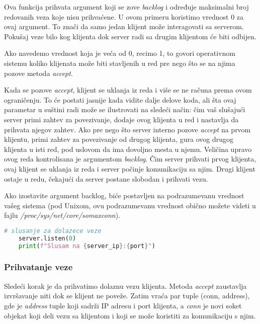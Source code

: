 Ova funkcija prihvata argument koji se zove \emph{backlog} i određuje maksimalni broj redovanih veza koje nisu prihvaćene. U ovom primeru koristimo vrednost 0 za ovaj argument. To znači da samo jedan klijent može interagovati sa serverom. Pokušaj veze bilo kog klijenta dok server radi sa drugim klijentom će biti odbijen.

Ako navedemo vrednost koja je veća od 0, recimo 1, to govori operativnom sistemu koliko klijenata može biti stavljenih u red pre nego što se na njima pozove metoda \emph{accept}.

Kada se pozove \emph{accept}, klijent se uklanja iz reda i više se ne računa prema ovom ograničenju. To će postati jasnije kada vidite dalje delove koda, ali šta ovaj parametar u suštini radi može se ilustrovati na sledeći način: čim vaš slušajući server primi zahtev za povezivanje, dodaje ovog klijenta u red i nastavlja da prihvata njegov zahtev. Ako pre nego što server interno pozove \emph{accept} na prvom klijentu, primi zahtev za povezivanje od drugog klijenta, gura ovog drugog klijenta u isti red, pod uslovom da ima dovoljno mesta u njemu. Veličina upravo ovog reda kontrolisana je argumentom \emph{backlog}. Čim server prihvati prvog klijenta, ovaj klijent se uklanja iz reda i server počinje komunikaciju sa njim. Drugi klijent ostaje u redu, čekajući da server postane slobodan i prihvati vezu.

Ako izostavite argument backlog, biće postavljen na podrazumevanu vrednost vašeg sistema (pod Unixom, ovu podrazumevanu vrednost obično možete videti u fajlu \emph{/proc/sys/net/core/somaxconn}).

\vspace{0.5cm}

\begin{lstlisting}[language = Python]
    # slusanje za dolazece veze
    server.listen(0)
    print(f"Slusam na {server_ip}:{port}")
\end{lstlisting}

\subsubsection{Prihvatanje veze}

Sledeći korak je da prihvatimo dolaznu vezu klijenta. Metoda \emph{accept} zaustavlja izvršavanje niti dok se klijent ne poveže. Zatim vraća par tuple (conn, address), gde je \emph{address} tuple koji sadrži IP adresu i port klijenta, a \emph{conn} je novi soket objekat koji deli vezu sa klijentom i koji se može koristiti za komunikaciju s njim.

